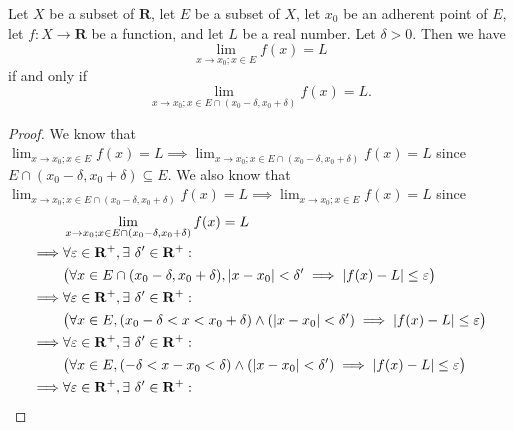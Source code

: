 \begin{proposition}\label{9.3.18}
    Let \(X\) be a subset of \(\mathbf{R}\), let \(E\) be a subset of \(X\), let \(x_0\) be an adherent point of \(E\), let \(f : X \to \mathbf{R}\) be a function, and let \(L\) be a real number.
    Let \(\delta > 0\).
    Then we have
    \[
        \lim_{x \to x_0 ; x \in E} f(x) = L
    \]
    if and only if
    \[
        \lim_{x \to x_0 ; x \in E \cap (x_0 - \delta, x_0 + \delta)} f(x) = L.
    \]
\end{proposition}

\begin{proof}
    We know that \(\lim_{x \to x_0 ; x \in E} f(x) = L \implies \lim_{x \to x_0 ; x \in E \cap (x_0 - \delta, x_0 + \delta)} f(x) = L\) since \(E \cap (x_0 - \delta, x_0 + \delta) \subseteq E\).
    We also know that \(\lim_{x \to x_0 ; x \in E \cap (x_0 - \delta, x_0 + \delta)} f(x) = L \implies \lim_{x \to x_0 ; x \in E} f(x) = L\) since
    \begin{align*}
                 & \lim_{x \to x_0 ; x \in E \cap (x_0 - \delta, x_0 + \delta)} f(x) = L                                                                   \\
        \implies & \forall \varepsilon \in \mathbf{R}^+, \exists\ \delta' \in \mathbf{R}^+ :                                                               \\
                 & \big(\forall x \in E \cap (x_0 - \delta, x_0 + \delta), \abs*{x - x_0} < \delta' \implies \abs*{f(x) - L} \leq \varepsilon\big)         \\
        \implies & \forall \varepsilon \in \mathbf{R}^+, \exists\ \delta' \in \mathbf{R}^+ :                                                               \\
                 & \big(\forall x \in E, (x_0 - \delta < x < x_0 + \delta) \land (\abs*{x - x_0} < \delta') \implies \abs*{f(x) - L} \leq \varepsilon\big) \\
        \implies & \forall \varepsilon \in \mathbf{R}^+, \exists\ \delta' \in \mathbf{R}^+ :                                                               \\
                 & \big(\forall x \in E, (-\delta < x - x_0 < \delta) \land (\abs*{x - x_0} < \delta') \implies \abs*{f(x) - L} \leq \varepsilon\big)      \\
        \implies & \forall \varepsilon \in \mathbf{R}^+, \exists\ \delta' \in \mathbf{R}^+ :                                                               \\

\end{align*}
\end{proof}
